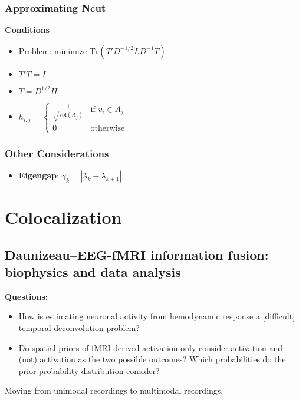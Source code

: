 \documentclass{article}
\begin{document}
        \subsubsection{Approximating Ncut}
            
            \textbf{Conditions}
            \begin{itemize}            
                \item Problem: minimize \ensuremath{\text{Tr}(T'D^{-1/2}LD^{-1}T)}
                \item \ensuremath{T'T = I}
                \item \ensuremath{T=D^{1/2}H}
                \item \begin{math}
                        h_{i,j} = \left\{
                            \begin{array}{lr}
                            \frac{1}{\sqrt{\text{vol}(A_j)}}&\text{if } v_i \in    
A_j\\
                            0&\text{otherwise}
                            \end{array}\right. 
                \end{math}
            \end{itemize}

        \subsubsection{Other Considerations}
             \begin{itemize}
                    \item \textbf{Eigengap}: \ensuremath{\gamma_k =
|\lambda_k-\lambda_{k+1}|}
             \end{itemize}
\section{Colocalization} 
        \subsection{Daunizeau--EEG-fMRI information fusion: biophysics and data 
    analysis}
            \textbf{Questions:}
            \begin{itemize}
                \item How is estimating neuronal activity from hemodynamic
response a [difficult] temporal deconvolution problem?
                \item Do spatial priors of fMRI derived activation only consider
activation and (not) activation as the two possible outcomes? Which
probabilities do the prior probability distribution consider?
            \end{itemize}     
            Moving from unimodal recordings to multimodal recordings. 
\end{document}
